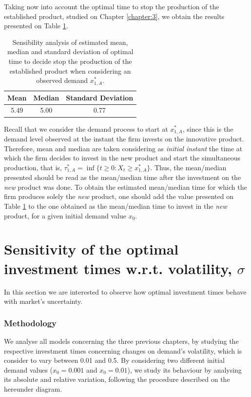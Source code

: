 Taking now into account the optimal time to stop the production of the established product, studied on Chapter \ref{chapter:3}, we obtain the results presented on Table \ref{stoptime_t}.
\begin{table}[!htb]
	\caption{Sensibility analysis of estimated mean, median and standard deviation of optimal time to decide stop the production of the established product when considering an observed demand $x_{1,A}^*$.}
	\centering
	\begin{tabular}{ccc}
		Mean & Median & Standard Deviation \\ \hline
		5.49 & 5.00 & 0.77
	\end{tabular}
\label{stoptime_t}
\end{table}

Recall that we consider the demand process to start at $x_{1,A}^*$, since this is the demand level observed at the instant the firm invests on the innovative product. Therefore, mean and median are taken considering as \textit{initial instant} the time at which the firm decides to invest in the new product and start the simultaneous production, that is, $\tau^*_{1,A}=\inf \{ t\geq 0: X_t \geq x^*_{1,A} \}$. Thus, the mean/median presented should be read as the mean/median time after the investment on the \textit{new} product was done. To obtain the estimated mean/median time for which the firm produces solely the \textit{new} product, one should add the value presented on Table \ref{stoptime_t} to the one obtained as the mean/median time to invest in the \textit{new} product, for a given initial demand value $x_0$.    



\section{Sensitivity of the optimal investment times w.r.t. volatility, $\sigma$}

In this section we are interested to observe how optimal investment times behave with market's uncertainty.

\subsubsection{Methodology}

We analyse all models concerning the three previous chapters, by studying the respective investment times concerning changes on demand's volatility, which is consider to vary between 0.01 and 0.5. By considering two different initial demand values ($x_0=0.001$ and $x_0=0.01$), we study its behaviour by analysing its absolute and relative variation, following the procedure described on the hereunder diagram. 


